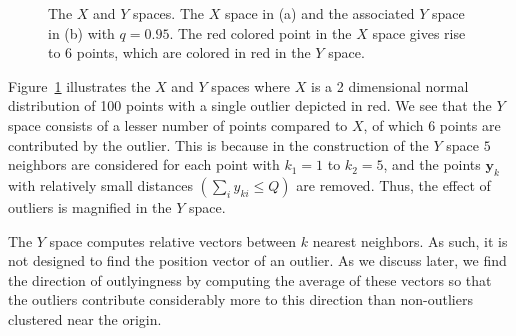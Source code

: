 \documentclass[letter,12pt]{article}
\begin{document}
\begin{figure}[!ht]
	\centering
	\hfill
	\caption{The $X$ and $Y$ spaces. The $X$ space in (a) and the associated $Y$ space in (b) with $q = 0.95$. The red colored point in the $X$ space gives rise to 6 points, which are colored in red in the $Y$ space.}
	\label{fig:XandY}
\end{figure}

Figure~\ref{fig:XandY} illustrates the $X$ and $Y$ spaces where $X$ is a 2 dimensional normal distribution of 100 points with a single outlier depicted in red.  We see that the $Y$ space consists of a lesser number of points compared to $X$, of which 6 points are contributed by the outlier. This is because in the construction of the $Y$ space $5$ neighbors are considered for each point with $k_1=1$ to $k_2=5$, and the points $\bm{y}_k$ with relatively small distances $\left(\sum_i y_{ki} \leq Q\right)$ are removed. Thus, the effect of outliers is magnified in the $Y$ space. 

{\color{blue} The $Y$ space computes relative vectors between $k$ nearest neighbors. As such, it is not designed to find the position vector of an outlier. As we discuss later, we find the direction of outlyingness by computing the average of these vectors so that the outliers contribute considerably more to this direction than non-outliers clustered near the origin.   } %
\end{document}
